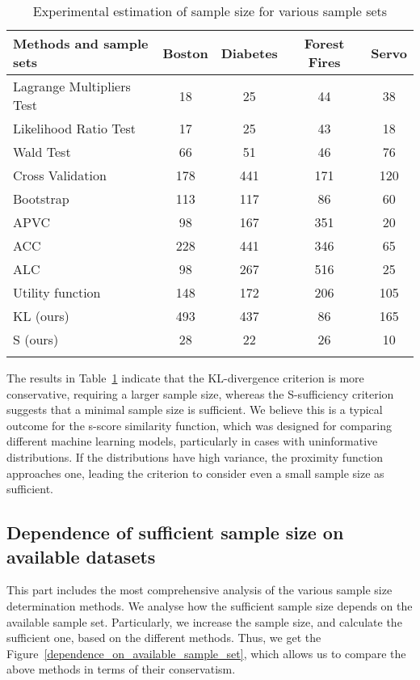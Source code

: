 \documentclass[sn-mathphys-num]{sn-jnl}%
\begin{document}
\begin{table}[ht]
    \centering
    \caption{Experimental estimation of sample size for various sample sets}\label{table:results}
    \begin{tabular}{lcccc}
    \hline
        \toprule
        Methods and sample sets & Boston & Diabetes & Forest Fires & Servo \\ 
        \midrule
        Lagrange Multipliers Test & 18 & 25 & 44 & 38 \\
        Likelihood Ratio Test & 17 & 25 & 43 & 18 \\
        Wald Test & 66 & 51 & 46 & 76 \\ 
        Cross Validation & 178 & 441 & 171 & 120 \\ 
        Bootstrap & 113 & 117 & 86 & 60 \\ 
        APVC & 98 & 167 & 351 & 20 \\ 
        ACC & 228 & 441 & 346 & 65 \\ 
        ALC & 98 & 267 & 516 & 25 \\ 
        Utility function & 148 & 172 & 206 & 105 \\ 
        \midrule
        KL (ours) & 493 & 437 & 86 & 165 \\ 
        S (ours) & 28 & 22 & 26 & 10 \\
        \botrule
    \end{tabular}
\end{table}

The results in Table~\ref{table:results} indicate that the KL-divergence criterion is more conservative, requiring a larger sample size, whereas the S-sufficiency criterion suggests that a minimal sample size is sufficient. We believe this is a typical outcome for the s-score similarity function, which was designed for comparing different machine learning models, particularly in cases with uninformative distributions. If the distributions have high variance, the proximity function approaches one, leading the criterion to consider even a small sample size as sufficient.

\subsection{Dependence of sufficient sample size on available datasets}

This part includes the most comprehensive analysis of the various sample size determination methods. We analyse how the sufficient sample size depends on the available sample set. Particularly, we increase the sample size, and calculate the sufficient one, based on the different methods. Thus, we get the Figure~\ref{dependence_on_available_sample_set}, which allows us to compare the above methods in terms of their conservatism. 
\end{document}
